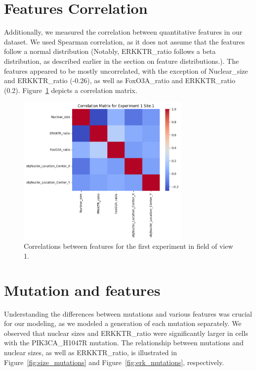 \documentclass[licencjacka,en]{pracamgr}
\begin{document}
\section{Features Correlation}

Additionally, we measured the correlation between quantitative features in our dataset. We used Spearman correlation, as it does not assume that the features follow a normal distribution (Notably, ERKKTR\_ratio follows a beta distribution, as described earlier in the section on feature distributions.). The features appeared to be mostly uncorrelated, with the exception of Nuclear\_size and ERKKTR\_ratio (-0.26), as well as FoxO3A\_ratio and ERKKTR\_ratio (0.2). Figure~\ref{fig:correlation} depicts a correlation matrix.

\begin{figure}[ht]
    \centering
    \includegraphics[width=0.75\textwidth]{images/correlation.png}
    \caption{Correlations between features for the first experiment in field of view 1.}
    \label{fig:correlation}
\end{figure} 

\section{Mutation and features}
Understanding the differences between mutations and various features was crucial for our modeling, as we modeled a generation of each mutation separately. We observed that nuclear sizes and ERKKTR\_ratio were significantly larger in cells with the PIK3CA\_H1047R mutation. The relationship between mutations and nuclear sizes, as well as ERKKTR\_ratio, is illustrated in Figure~\ref{fig:size_mutations} and Figure~\ref{fig:erk_mutations}, respectively.
\end{document}
